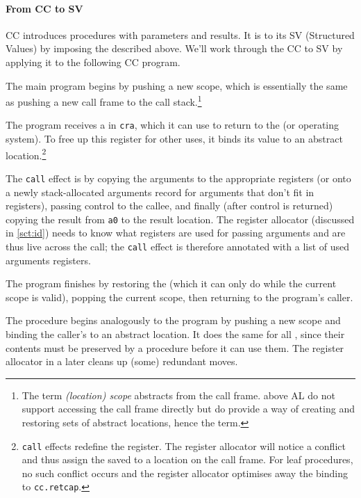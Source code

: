 \documentclass[main.tex]{subfiles}
\begin{document}
\paragraph{From CC to SV} CC introduces procedures with parameters and results. It is \lowered{} to its  SV (Structured Values) by imposing the  described above. We'll work through the CC to SV  by applying it to the following CC program.

The main program begins by pushing a new scope, which is essentially the same as pushing a new call frame to the call stack.\footnote{The term \emph{(location) scope} abstracts from the call frame.  above AL do not support accessing the call frame directly but do provide a way of creating and restoring sets of abstract locations, hence the term.}

The program receives a  in \texttt{cra}, which it can use to return to the  (or operating system). To free up this register for other uses, it binds its value to an abstract location.\footnote{\texttt{call} effects redefine the register. The register allocator will notice a conflict and thus assign the saved  to a location on the call frame. For leaf procedures, no such conflict occurs and the register allocator optimises away the binding to \texttt{cc.retcap}.}

The \texttt{call} effect is \lowered{} by copying the arguments to the appropriate registers (or onto a newly stack-allocated arguments record for arguments that don't fit in registers), passing control to the callee, and finally (after control is returned) copying the result from \texttt{a0} to the result location. The register allocator (discussed in \cref{sct:id}) needs to know what registers are used for passing arguments and are thus live across the call; the \texttt{call} effect is therefore annotated with a list of used arguments registers.

The program finishes by restoring the  (which it can only do while the current scope is valid), popping the current scope, then returning to the program's caller.

The procedure begins analogously to the program by pushing a new scope and binding the caller's  to an abstract location. It does the same for all , since their contents must be preserved by a procedure before it can use them. The register allocator in a later  cleans up (some) redundant moves.
\end{document}

